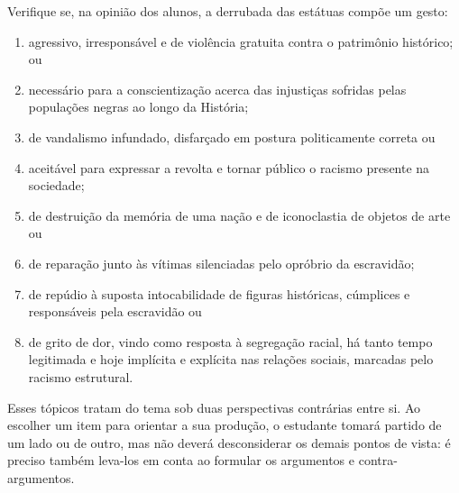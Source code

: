 \documentclass[11pt]{extarticle}
\begin{document}
Verifique se, na opinião dos alunos, a derrubada das estátuas compõe um
gesto:

\begin{enumerate}
\item agressivo, irresponsável e de violência gratuita contra o
patrimônio histórico; ou 
\item necessário para a conscientização acerca
das injustiças sofridas pelas populações negras ao longo da História;
\item de vandalismo infundado, disfarçado em postura politicamente correta
ou 
\item aceitável para expressar a revolta e tornar público o racismo
presente na sociedade; 
\item de destruição da memória de uma nação e de
iconoclastia de objetos de arte ou 
\item de reparação junto às vítimas
silenciadas pelo opróbrio da escravidão; 
\item de repúdio à suposta
intocabilidade de figuras históricas, cúmplices e responsáveis pela
escravidão ou 
\item de grito de dor, vindo como resposta à segregação
racial, há tanto tempo legitimada e hoje implícita e explícita nas
relações sociais, marcadas pelo racismo estrutural.
\end{enumerate}

Esses tópicos tratam do tema sob duas perspectivas contrárias entre si.
Ao escolher um item para orientar a sua produção, o estudante tomará
partido de um lado ou de outro, mas não deverá desconsiderar os demais
pontos de vista: é preciso também leva-los em conta ao formular os
argumentos e contra-argumentos.
\end{document}
